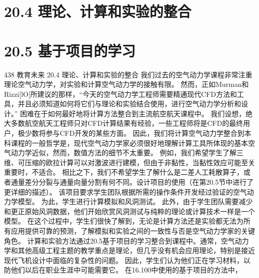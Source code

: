 \documentclass[UTF8,11pt,a4paper,openany,fontset=fandol]{ctexbook}
\begin{document}
\section{20.4 理论、计算和实验的整合}
\section{20.5 基于项目的学习}
438 教育未来 20.4 理论、计算和实验的整合 我们过去的空气动力学课程非常注重理论空气动力学，对实验和计算空气动力学的接触有限。 然而，正如Murman和Rizzi[lO]所建议的那样，“今天的空气动力学工程师需要精通现代CFD方法和工具，并且必须知道如何将它们与理论和实验结合使用，进行空气动力学分析和设计。” 困难在于如何最好地将计算方法整合到主流航空航天课程中。 我们设想，绝大多数航空航天工程师只对CFD计算结果有经验，一些工程师将是CFD的最终用户，极少数将参与CFD开发的某些方面。 因此，我们将计算空气动力学整合到本科课程的一般哲学是，现代空气动力学家必须很好地理解计算工具所体现的基本空气动力学近似，然而，数值方法的细节不太重要。 例如，我们希望学生了解三维、可压缩的欧拉计算可以对激波进行建模，但由于非黏性，当黏性效应可能至关重要时，不适合。 相比之下，我们不希望学生了解什么是二差人工耗散算子，或者通量差分分裂与通量向量分割有何不同。设计项目的使用（在第20.5节中进行了更详细的描述）。 该项目要求学生团队根据所需的操作条件开发经过验证的空气动力学模型。 为此，学生进行计算模拟和风洞测试。 此外，由于学生团队需要减少和更正原始风洞数据，他们开始欣赏风洞测试与纯粹的理论或计算技术一样是一个模型。 在这个过程中，学生们很快了解到，无论是计算方法还是实验都无法为所有应用提供可靠的预测，了解模拟和实验之间的一致性与否是空气动力学家的关键角色。 计算和实验方法通过20.5基于项目的学习整合到课程中。通常，空气动力学和其他高级工程主题的教学重点是理论，但几乎没有机会应用理论，特别是接近现代飞机设计中面临的复杂性的问题。 因此，学生们认为他们正在学习材料，以防他们以后在职业生涯中可能需要它。 在16.100中使用的基于项目的方法中，
\end{document}
